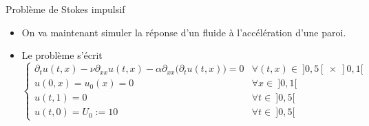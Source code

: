 

\begin{frame}{Problème de Stokes impulsif}
    \begin{itemize}
        \item On va maintenant simuler la réponse d'un fluide à l'accélération 
d'une paroi. 
\item Le problème s'écrit
\begin{equation*}
    \begin{cases}
        \partial_tu(t,x) - \nu\partial_{xx} u(t,x) - \alpha\partial_{xx} \big(\partial_t u(t,x)\big) = 0 & \forall (t,x) \in \ ]0, 5[ \ \times \ ]0,1[  \\
        u(0,x) = u_0(x) = 0 & \forall x \in \ ]0,1[ \\
        u(t,1) = 0 & \forall t \in \ ]0,5[ \\
        u(t,0) = U_0:=10 & \forall t \in \ ]0,5[
    \end{cases}
\end{equation*}
    \end{itemize}
\end{frame}

